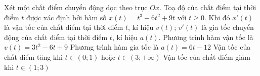 \begin{ex}
	Xét một chất điểm chuyển động dọc theo trục $Ox$. Toạ độ của chất điểm tại thời điểm $t$ được xác định bởi hàm số $x(t)=t^3-6t^2+9t$ với $t\geq 0$. Khi đó $x'(t)$ là vận tốc của chất điểm tại thời điểm $t$, kí hiệu $v(t)$; $v'(t)$ là gia tốc chuyển động của chất điểm tại thời điểm $t$, kí hiệu $a(t)$.
	\choiceTF
	{Phương trình hàm vận tốc là $v(t)=3t^2-6t+9$}
	{\True Phương trình hàm gia tốc là $a(t)=6t-12$}
	{Vận tốc của chất điểm tăng khi $t\in (0;1)$ hoặc  $t \in (3;+\infty)$}
	{Vận tốc của chất điểm giảm khi $t\in (1;3)$}
\end{ex}

